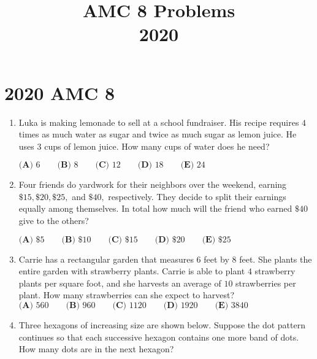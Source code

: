 \documentclass{article}
\title{AMC 8 Problems \\ 2020}
\date{}
\begin{document}
\maketitle\thispagestyle{fancy}\newpage\section*{2020 AMC 8}\begin{enumerate}[label=\arabic*., itemsep=0.5em]\item Luka is making lemonade to sell at a school fundraiser. His recipe requires \(4\) times as much water as sugar and twice as much sugar as lemon juice. He uses \(3\) cups of lemon juice. How many cups of water does he need? 

\(\textbf{(A) } 6\qquad\textbf{(B) } 8\qquad\textbf{(C) } 12\qquad\textbf{(D) } 18\qquad\textbf{(E) } 24\qquad\)\par \vspace{0.5em}\item Four friends do yardwork for their neighbors over the weekend, earning \(\$15, \$20, \$25,\) and \(\$40,\) respectively. They decide to split their earnings equally among themselves. In total how much will the friend who earned \(\$40\) give to the others?

\(\textbf{(A) }\$5 \qquad \textbf{(B) }\$10 \qquad \textbf{(C) }\$15 \qquad \textbf{(D) }\$20 \qquad \textbf{(E) }\$25\)\par \vspace{0.5em}\item Carrie has a rectangular garden that measures \(6\) feet by \(8\) feet. She plants the entire garden with strawberry plants. Carrie is able to plant \(4\) strawberry plants per square foot, and she harvests an average of \(10\) strawberries per plant. How many strawberries can she expect to harvest?
\(\textbf{(A) }560 \qquad \textbf{(B) }960 \qquad \textbf{(C) }1120 \qquad \textbf{(D) }1920 \qquad \textbf{(E) }3840\)\par \vspace{0.5em}\item Three hexagons of increasing size are shown below. Suppose the dot pattern continues so that each successive hexagon contains one more band of dots. How many dots are in the next hexagon?



\end{enumerate}
\end{document}
